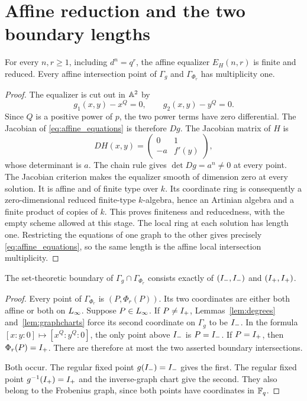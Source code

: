 \section{Affine reduction and the two boundary lengths}\label{sec:boundary}

\begin{lemma}\label{lem:affine}
For every $n,r\geq1$, including $d^n=q^r$, the affine equalizer
$E_H(n,r)$ is finite and reduced. Every affine intersection point of
$\Gamma_g$ and $\Gamma_{\Phi_r}$ has multiplicity one.
\end{lemma}

\begin{proof}
The equalizer is cut out in $\mathbb A^2$ by
\begin{equation}\label{eq:affine_equations}
 g_1(x,y)-x^Q=0,\qquad g_2(x,y)-y^Q=0.
\end{equation}
Since $Q$ is a positive power of $p$, the two power terms have zero
differential. The Jacobian of \eqref{eq:affine_equations} is therefore
$Dg$. The Jacobian matrix of $H$ is
\[
 DH(x,y)=\begin{pmatrix}0&1\\-a&f'(y)\end{pmatrix},
\]
whose determinant is $a$. The chain rule gives $\det Dg=a^n\ne0$
at every point. The Jacobian criterion makes the equalizer smooth of
dimension zero at every solution. It is affine and of finite type over
$k$. Its coordinate ring is consequently a zero-dimensional reduced
finite-type $k$-algebra, hence an Artinian algebra and a finite product
of copies of $k$. This proves finiteness and reducedness, with the empty
scheme allowed at this stage. The local ring at each solution has length
one. Restricting the equations of one graph to the other gives precisely
\eqref{eq:affine_equations}, so the same length is the affine local
intersection multiplicity.
\end{proof}

\begin{lemma}\label{lem:location}
The set-theoretic boundary of $\Gamma_g\cap\Gamma_{\Phi_r}$ consists
exactly of $(I_{-},I_{-})$ and $(I_{+},I_{+})$.
\end{lemma}

\begin{proof}
Every point of $\Gamma_{\Phi_r}$ is $(P,\Phi_r(P))$. Its two coordinates
are either both affine or both on $L_{\infty}$. Suppose $P\in L_{\infty}$.
If $P\ne I_{+}$, Lemmas~\ref{lem:degrees} and~\ref{lem:graphcharts}
force its second coordinate on $\Gamma_g$ to be $I_{-}$. In the formula
$[x:y:0]\mapsto[x^Q:y^Q:0]$, the only point above $I_{-}$ is
$P=I_{-}$. If $P=I_{+}$, then $\Phi_r(P)=I_{+}$. There are therefore
at most the two asserted boundary intersections.

Both occur. The regular fixed point $g(I_{-})=I_{-}$ gives the first.
The regular fixed point $g^{-1}(I_{+})=I_{+}$ and the inverse-graph chart
give the second. They also belong to the Frobenius graph, since both
points have coordinates in $\mathbb F_q$.
\end{proof}

